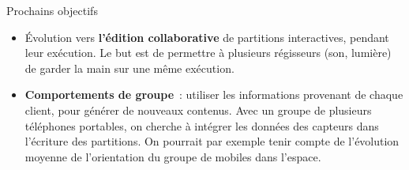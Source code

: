 \begin{block}{Prochains objectifs}
	\begin{itemize}
		\item Évolution vers \textbf{l'édition collaborative} de partitions interactives, pendant leur exécution.
         Le but est de permettre à plusieurs régisseurs (son, lumière) de garder la main sur une même exécution.
		\item \textbf{Comportements de groupe}~: utiliser les informations provenant de chaque client, pour générer de nouveaux contenus. 
        Avec un groupe de plusieurs téléphones portables, on cherche à intégrer les données des capteurs dans l'écriture des partitions. On pourrait par exemple tenir compte de l'évolution moyenne de l'orientation du groupe de mobiles dans l'espace.
	\end{itemize}
\end{block}